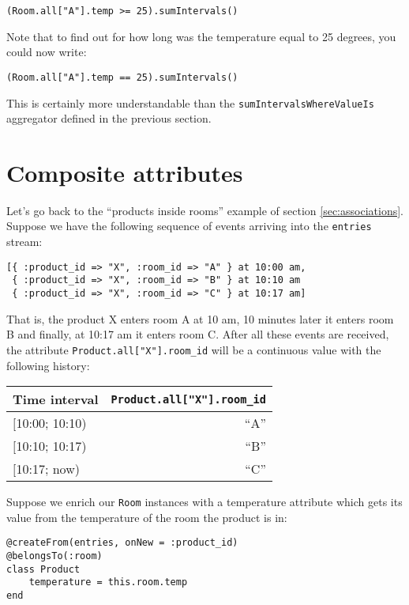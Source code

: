 \documentclass{report}
\begin{document}
\begin{verbatim}
(Room.all["A"].temp >= 25).sumIntervals()
\end{verbatim}

Note that to find out for how long was the temperature equal to 25
degrees, you could now write:

\begin{verbatim}
(Room.all["A"].temp == 25).sumIntervals()
\end{verbatim}


This is certainly more understandable than the
\verb=sumIntervalsWhereValueIs= aggregator defined in the previous
section.

\section{Composite attributes}

Let's go back to the ``products inside rooms'' example of section
\ref{sec:associations}. Suppose we have the following sequence of
events arriving into the \verb=entries= stream:

\begin{verbatim}
[{ :product_id => "X", :room_id => "A" } at 10:00 am,
 { :product_id => "X", :room_id => "B" } at 10:10 am
 { :product_id => "X", :room_id => "C" } at 10:17 am]
\end{verbatim}

That is, the product X enters room A at 10 am, 10 minutes later it
enters room B and finally, at 10:17 am it enters room C. After all
these events are received, the attribute
\verb=Product.all["X"].room_id= will be a continuous value with the
following history:

\begin{tabular}{ |l|r| }
  \hline
  Time interval & \verb=Product.all["X"].room_id= \\
  \hline
  $[$10:00; 10:10) & ``A'' \\
  $[$10:10; 10:17) & ``B'' \\
  $[$10:17;   now) & ``C'' \\
  \hline
\end{tabular}

Suppose we enrich our \verb=Room= instances with a temperature
attribute which gets its value from the temperature of the room the
product is in:

\begin{verbatim}
@createFrom(entries, onNew = :product_id)
@belongsTo(:room)
class Product
    temperature = this.room.temp
end
\end{verbatim}
\end{document}
